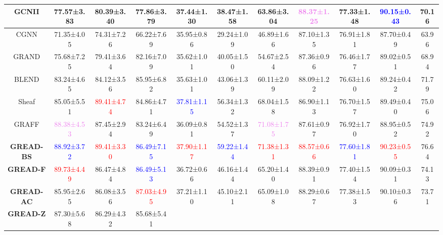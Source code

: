 \documentclass{article}
\theoremstyle{plain}
\theoremstyle{definition}
\theoremstyle{remark}
\newcommand{\std}{\scriptsize{}}
\newcommand{\BEST}[1]{\textcolor{red}{#1}}
\newcommand{\SECOND}[1]{\textcolor{blue}{#1}}
\newcommand{\THIRD}[1]{\textcolor{violet}{#1}}
\begin{document}
\begin{table*}[ht]
\begin{tabular}{c ccccccccc c}
        \midrule
GCNII	    & 77.57\std{±3.83} & 80.39\std{±3.40} & 77.86\std{±3.79} & 37.44\std{±1.30} & 38.47\std{±1.58} & 63.86\std{±3.04} & \THIRD{88.37\std{±1.25}} & 77.33\std{±1.48} & \SECOND{90.15\std{±0.43}} & 70.16\\
\midrule
        CGNN	    & 71.35\std{±4.05} & 74.31\std{±7.26} & 66.22\std{±7.69} & 35.95\std{±0.86} & 29.24\std{±1.09} & 46.89\std{±1.66} & 87.10\std{±1.35} & 76.91\std{±1.81} & 87.70\std{±0.49} & 63.96\\
GRAND       & 75.68\std{±7.25} & 79.41\std{±3.64} & 82.16\std{±7.09} & 35.62\std{±1.01} & 40.05\std{±1.50} & 54.67\std{±2.54} & 87.36\std{±0.96} & 76.46\std{±1.77} & 89.02\std{±0.51} & 68.94\\
        BLEND       & 83.24\std{±4.65} & 84.12\std{±3.56} & 85.95\std{±6.82} & 35.63\std{±1.01} & 43.06\std{±1.39} & 60.11\std{±2.09} & 88.09\std{±1.22} & 76.63\std{±1.60} & 89.24\std{±0.42} & 71.79\\
Sheaf       & 85.05\std{±5.51} & \BEST{89.41\std{±4.74}} & 84.86\std{±4.71} & \SECOND{37.81\std{±1.15}} & 56.34\std{±1.32} & 68.04\std{±1.58} & 86.90\std{±1.13} & 76.70±\std{1.57} & 89.49\std{±0.40} & 75.06\\
        GRAFF       & \THIRD{88.38\std{±4.53}} & 87.45\std{±2.94} & 83.24\std{±6.49} & 36.09\std{±0.81} & 54.52\std{±1.37} & \THIRD{71.08\std{±1.75}} & 87.61\std{±0.97} & 76.92±\std{1.70} & 88.95\std{±0.52} & 74.92\\
        \midrule
        \textbf{GREAD-BS}
                    & \SECOND{88.92\std{±3.72}} & \BEST{89.41\std{±3.30}} & \SECOND{86.49\std{±7.15}} 
                    & \BEST{37.90\std{±1.17}} & \SECOND{59.22\std{±1.44}} & \BEST{71.38\std{±1.31}} 
                    & \BEST{88.57\std{±0.66}} & \SECOND{77.60\std{±1.81}} & \BEST{90.23\std{±0.55}} & 76.64\\
        \textbf{GREAD-F} 
                    & \BEST{89.73\std{±4.49}} & 86.47\std{±4.84} & \SECOND{86.49\std{±5.13}}
                    & 36.72\std{±0.66}	& 46.16\std{±1.44} & 65.20\std{±1.40} 
                    & 88.39\std{±0.91} & 77.40\std{±1.54}	& 90.09\std{±0.31} & 74.13\\
        \textbf{GREAD-AC}
                    & 85.95\std{±2.65} & 86.08\std{±3.56} & \BEST{87.03\std{±4.95}} 
                    & 37.21\std{±1.10} & 45.10\std{±2.11} & 65.09\std{±1.08} 
                    & 88.29\std{±0.67} & 77.38\std{±1.53} & 90.10\std{±0.36} & 73.71\\
        \textbf{GREAD-Z} 
                    & 87.30\std{±5.68} & 86.29\std{±4.32} & 85.68\std{±5.41} 

\end{tabular}
\end{table*}
\end{document}
